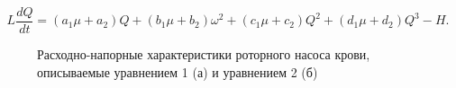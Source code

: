 \begin{equation}
	\label{eq:first_step_pump_model}
	L\frac{dQ}{dt} = (a_1\mu+a_2)Q + (b_1\mu+b_2)\omega^2 + (c_1\mu+c_2)Q^2 + (d_1\mu+d_2)Q^3 - H.
\end{equation}

\begin{figure}[ht]
  \begin{minipage}[ht]{0.48\linewidth}
  \end{minipage}
  \hfill
  \begin{minipage}[ht]{0.48\linewidth}
  \end{minipage}
  \caption{Расходно-напорные характеристики роторного насоса крови, описываемые уравнением 1 (а) и уравнением 2 (б)}
  \label{img:pump_model_development}  
\end{figure}

